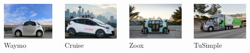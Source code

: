 \begin{frame}
\begin{columns}[T]
    \begin{column}{.25\textwidth}
        \centering
        \includegraphics[height=1.9cm]{images/waymo_firefly.jpg} \\
        \footnotesize Waymo \cite{WaymoPress}
    \end{column}
    \begin{column}{.25\textwidth}
        \centering
        \includegraphics[height=1.9cm]{images/cruise_vehicle.jpg} \\
        \footnotesize Cruise \cite{CruiseNews}
    \end{column}
    \begin{column}{.25\textwidth}
        \centering
        \includegraphics[height=1.9cm]{images/zoox_vehicle.jpg} \\
        \footnotesize Zoox \cite{ZooxPress}
    \end{column}
    \begin{column}{.25\textwidth}
        \centering
        \includegraphics[height=1.9cm]{images/tusimple_vehicle.jpg} \\
        \footnotesize TuSimple \cite{TuSimpleMedia}
    \end{column}
\end{columns}
\end{frame}

